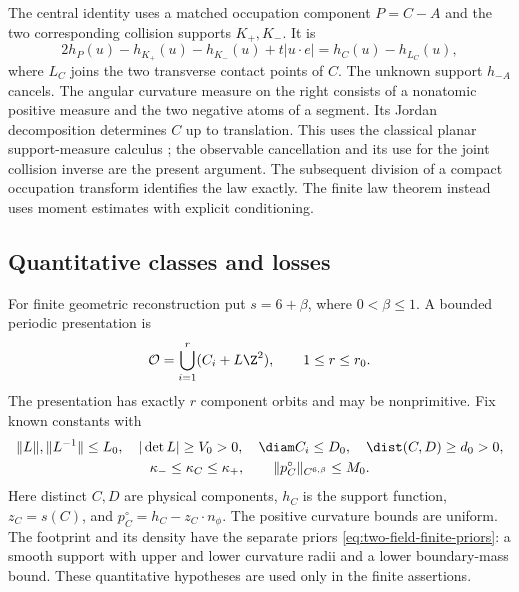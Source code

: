 The central identity uses a matched occupation component $P=C-A$
and the two corresponding collision supports $K_+,K_-$. It is
\[
  2h_P(u)-h_{K_+}(u)-h_{K_-}(u)+t|u\cdot e|=h_C(u)-h_{L_C}(u),
\]
where $L_C$ joins the two transverse contact points of $C$. The
unknown support $h_{-A}$ cancels. The angular curvature measure on
the right consists of a nonatomic positive measure and the two
negative atoms of a segment. Its Jordan decomposition determines
$C$ up to translation. This uses the classical planar support-measure
calculus \cite{Schneider,MartinezMaure}; the observable cancellation
and its use for the joint collision inverse are the present argument.
The subsequent division of a compact occupation transform identifies
the law exactly. The finite law theorem instead uses moment estimates
with explicit conditioning.

\subsection{Quantitative classes and losses}
For finite geometric reconstruction put $s=6+\beta$, where
$0<\beta\le1$. A bounded periodic presentation is
\begin{equation}\label{eq:two-field-presentation}
 \mathcal O=\bigcup_{i=1}^r(C_i+L\Z^2),\qquad 1\le r\le r_0.
\end{equation}
The presentation has exactly $r$ component orbits and may be
nonprimitive. Fix known constants with
\begin{equation}\label{eq:two-field-geometric-priors}
 \begin{gathered}
 \|L\|,\|L^{-1}\|\le L_0,\quad |\det L|\ge V_0>0,\quad
 \diam C_i\le D_0,\quad \dist(C,D)\ge d_0>0,\\
 \kappa_-\le\kappa_C\le\kappa_+,\qquad
                 \|p_C^\circ\|_{C^{6,\beta}}\le M_0.
 \end{gathered}
\end{equation}
Here distinct $C,D$ are physical components, $h_C$ is the support
function, $z_C=s(C)$, and $p_C^\circ=h_C-z_C\cdot n_\phi$.
The positive curvature bounds are uniform. The footprint and its
density have the separate priors
\eqref{eq:two-field-finite-priors}: a smooth support with upper and
lower curvature radii and a lower boundary-mass bound. These
quantitative hypotheses are used only in the finite assertions.

